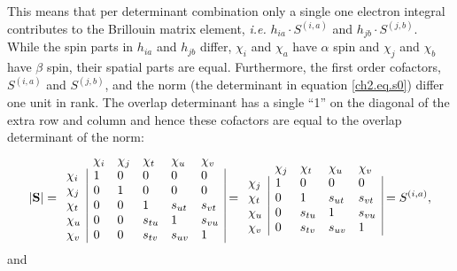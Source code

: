 This means that per determinant combination only a single one electron integral contributes to the Brillouin matrix element, \textit{i.e.} $h_{ia} \cdot S^{(i,a)}$ and $h_{jb} \cdot S^{(j,b)}$. While the spin parts in $h_{ia}$ and $h_{jb}$ differ, $\chi_i$ and $\chi_a$ have $\alpha$ spin and $\chi_j$ and $\chi_b$ have $\beta$ spin, their spatial parts are equal. Furthermore, the first order cofactors, $S^{(i,a)}$ and $S^{(j,b)}$, and the norm (the determinant in equation \ref{ch2.eq.s0}) differ one unit in rank. The overlap determinant has a single ``1'' on the diagonal of the extra row and column and hence these cofactors are equal to the overlap determinant of the norm:
\begin{equation}
|\mathbf{S}| =
\begin{array}{llllll}
 &  \chi_i & \chi_j & \chi_t & \chi_u & \chi_v \\
 \chi_i & \multicolumn{1}{|l}{ 1 } & 0 & 0 & 0 & \multicolumn{1}{l|}{ 0 } \\
 \chi_j & \multicolumn{1}{|l}{ 0 } & 1 & 0 & 0 & \multicolumn{1}{l|}{ 0 } \\
 \chi_t & \multicolumn{1}{|l}{ 0 } & 0 & 1 & s_{ut} & \multicolumn{1}{l|}{s_{vt}} \\
 \chi_u & \multicolumn{1}{|l}{ 0 } & 0 & s_{tu} & 1 & \multicolumn{1}{l|}{s_{vu}} \\
 \chi_v & \multicolumn{1}{|l}{ 0 } & 0 & s_{tv} & s_{uv} & \multicolumn{1}{l|}{1}
\end{array}=
\begin{array}{lllll}
 &  \chi_j & \chi_t & \chi_u & \chi_v \\
 \chi_j & \multicolumn{1}{|l}{ 1 } & 0 & 0 & \multicolumn{1}{l|}{ 0 } \\
 \chi_t & \multicolumn{1}{|l}{ 0 } & 1 & s_{ut} & \multicolumn{1}{l|}{ s_{vt} } \\
 \chi_u & \multicolumn{1}{|l}{ 0 } & s_{tu} & 1 & \multicolumn{1}{l|}{s_{vu}} \\
 \chi_v & \multicolumn{1}{|l}{ 0 } & s_{tv} & s_{uv} & \multicolumn{1}{l|}{1}
\end{array}=
S^{(i,a)},
\label{ch2.eq.sissia}
\end{equation}
and
